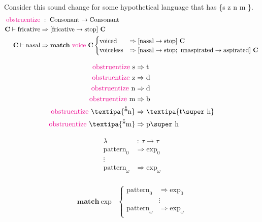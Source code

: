 \documentclass{report}[12pt]
\begin{document}
Consider this sound change for some hypothetical language that has \{s z n m  \}.
\begin{align*}
  \text{\textcolor{magenta}{obstruentize}} &\ :\ \text{Consonant} \rightarrow \text{Consonant} \\
  \textbf{C} \vdash \text{fricative} & \Rightarrow [\text{fricative} \rightarrow \text{stop}]\ \textbf{C} \\
  \textbf{C} \vdash \text{nasal} & \Rightarrow \textbf{match}\ \text{\textcolor{magenta}{voice}}\ \textbf{C}
                                   \begin{cases}
                                     \text{voiced} & \Rightarrow [\text{nasal} \rightarrow \text{stop}]\ \textbf{C} \\
                                     \text{voiceless} & \Rightarrow [\text{nasal} \rightarrow \text{stop};\ \text{unaspirated} \rightarrow \text{aspirated}]\ \textbf{C} \\
                                   \end{cases}
\end{align*}

\begin{align*}
  \text{\textcolor{magenta}{obstruentize}}\ \text{s} & \Rightarrow \text{t} \\
  \text{\textcolor{magenta}{obstruentize}}\ \text{z} & \Rightarrow \text{d} \\
  \text{\textcolor{magenta}{obstruentize}}\ \text{n} & \Rightarrow \text{d} \\
  \text{\textcolor{magenta}{obstruentize}}\ \text{m} & \Rightarrow \text{b} \\
  \text{\textcolor{magenta}{obstruentize}}\ \text{\textipa{\r*n}} & \Rightarrow \text{\textipa{t\super h}} \\
  \text{\textcolor{magenta}{obstruentize}}\ \text{\textipa{\r*m}} & \Rightarrow \text{p\super h} \\
\end{align*}

\begin{align*}
  \lambda &\ :\ \tau \rightarrow \tau \\
  \text{pattern}_0 & \Rightarrow \text{exp}_0 \\
  \vdots & \\
  \text{pattern}_\omega & \Rightarrow \text{exp}_\omega \\
\end{align*}

\begin{align*}
  \textbf{match}\ \text{exp} & \begin{cases}
                                 \text{pattern}_0 & \Rightarrow \text{exp}_0 \\
                                                  & \vdots \\
                                 \text{pattern}_\omega & \Rightarrow \text{exp}_\omega \\
                               \end{cases}\\
\end{align*}
\end{document}
